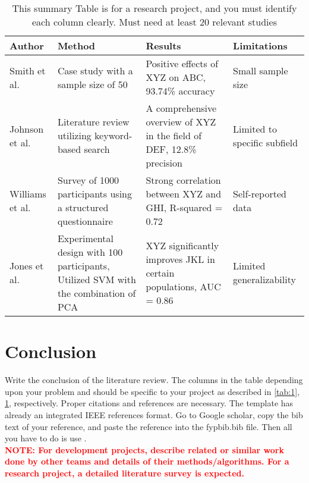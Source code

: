 \documentclass{FastFyp}
\begin{document}
\begin{table}[!h]
\caption{This summary Table is for a research project, and you must identify each column clearly. Must need at least 20 relevant studies}
\centering
\begin{tabular}{|p{3cm}|p{4cm}|p{4cm}|p{3cm}|}
\hline
\textbf{Author} & \textbf{Method} & \textbf{Results} & \textbf{Limitations} \\
\hline
Smith et al. \cite{ref:Bishop:2006}& Case study with a sample size of 50 & Positive effects of XYZ on ABC, 93.74\% accuracy & Small sample size \\
\hline
Johnson et al. \cite{ref:Duda:2000} & Literature review utilizing keyword-based search & A comprehensive overview of XYZ in the field of DEF, 12.8\% precision & Limited to specific subfield \\
\hline
Williams et al. \cite{ref:IJCNNChallenge:2007} & Survey of 1000 participants using a structured questionnaire & Strong correlation between XYZ and GHI, R-squared = 0.72 & Self-reported data \\
\hline
Jones et al. \cite{ref:SVMGuide} & Experimental design with 100 participants, Utilized SVM with the combination of PCA & XYZ significantly improves JKL in certain populations, AUC = 0.86 & Limited generalizability \\
\hline
\end{tabular}
\label{tab:2}
\end{table}

\section{Conclusion}
Write the conclusion of the literature review. 
The columns in the table depending upon your problem and should be specific to your project as described in \ref{tab:1}, \ref{tab:2}, respectively. Proper citations and references are necessary. The template has already an integrated IEEE references format. Go to Google scholar, copy the bib text of your reference, and paste the reference into the fypbib.bib file. Then all you have to do is use \cite{ref:Bishop:2006}.\\ \textcolor{red}{\textbf{NOTE: For development projects, describe related or similar work done by other teams and details of their methods/algorithms. For a research project, a detailed literature survey is expected.}}
 
\end{document}
